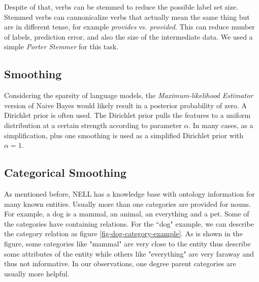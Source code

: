 Despite of that, verbs can be stemmed to reduce the possible label set size. Stemmed verbs can cannonicalize verbs that actually mean the same thing but are in different tense, for example \emph{provides} vs. \emph{provided}. This can reduce number of labels, prediction error, and also the size of the intermediate data. We used a simple \emph{Porter Stemmer} for this task.

\subsection{Smoothing}

Considering the sparsity of language models, the \emph{Maximum-likelihood Estimator} version of Naive Bayes would likely result in a posterior probability of zero. A Dirichlet prior is often used. The Dirichlet prior pulls the features to a uniform distribution at a certain strength according to parameter $\alpha$. In many cases, as a simplification, plus one smoothing is used as a simplified Dirichlet prior with $\alpha=1$.

\subsection{Categorical Smoothing}

As mentioned before, NELL has a knowledge base with ontology information for many known entities. Usually more than one categories are provided for nouns. For example, a dog is a mammal, an animal, an everything and a pet. Some of the categories have containing relations. For the ``dog" example, we can describe the category relation as figure \ref{fig-dog-category-example}. As is shown in the figure, some categories like "mammal" are very close to the entity thus describe some attributes of the entity while others like "everything" are very faraway and thus not informative. In our observations, one degree parent categories are usually more helpful.


